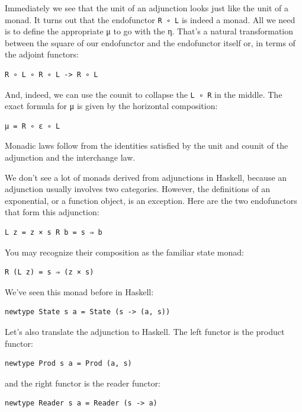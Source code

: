 Immediately we see that the unit of an adjunction looks just like the
unit of a monad. It turns out that the endofunctor \texttt{R\ ∘\ L} is
indeed a monad. All we need is to define the appropriate μ to go with
the η. That's a natural transformation between the square of our
endofunctor and the endofunctor itself or, in terms of the adjoint
functors:

\begin{verbatim}
R ∘ L ∘ R ∘ L -> R ∘ L
\end{verbatim}

And, indeed, we can use the counit to collapse the \texttt{L\ ∘\ R} in
the middle. The exact formula for μ is given by the horizontal
composition:

\begin{verbatim}
μ = R ∘ ε ∘ L
\end{verbatim}

Monadic laws follow from the identities satisfied by the unit and counit
of the adjunction and the interchange law.

We don't see a lot of monads derived from adjunctions in Haskell,
because an adjunction usually involves two categories. However, the
definitions of an exponential, or a function object, is an exception.
Here are the two endofunctors that form this adjunction:

\begin{verbatim}
L z = z × s R b = s ⇒ b
\end{verbatim}

You may recognize their composition as the familiar state monad:

\begin{verbatim}
R (L z) = s ⇒ (z × s)
\end{verbatim}

We've seen this monad before in Haskell:

\begin{verbatim}
newtype State s a = State (s -> (a, s))
\end{verbatim}

Let's also translate the adjunction to Haskell. The left functor is the
product functor:

\begin{verbatim}
newtype Prod s a = Prod (a, s)
\end{verbatim}

and the right functor is the reader functor:

\begin{verbatim}
newtype Reader s a = Reader (s -> a)
\end{verbatim}


